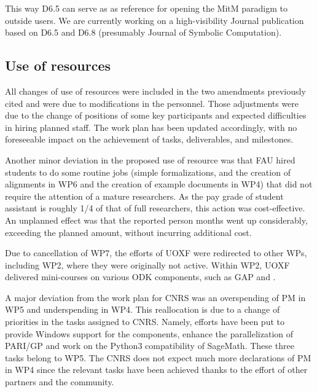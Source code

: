 This way D6.5 can serve as as reference for opening the MitM paradigm to outside users. We
are currently working on a high-visibility Journal publication based on D6.5 and D6.8
(presumably Journal of Symbolic Computation). 

\subsection{Use of resources}

All changes of use of resources were included in the two amendments previously cited and were
due to modifications in the personnel. Those adjustments were due to the change of positions
of some key \ODK participants and expected difficulties in hiring planned
staff. The work plan has been updated accordingly, with no foreseeable
impact on the achievement of tasks, deliverables, and milestones.

Another minor deviation in the proposed use of resource was that FAU hired students to do
some routine jobs (simple formalizations, and the creation of alignments in WP6 and the
creation of example documents in WP4) that did not require the attention of a mature
researchers. As the pay grade of student assistant is roughly 1/4 of that of full
researchers, this action was cost-effective. An unplanned effect was that the reported
person months went up considerably, exceeding the planned amount, without incurring
additional cost. 

Due to cancellation of WP7, the efforts of UOXF were redirected to other WPs, including
WP2, where they were originally not active. Within WP2, UOXF delivered mini-courses on various ODK components,
such as GAP and \Sage.

A major deviation from the work plan for CNRS was an overspending of PM in WP5 and
underspending in WP4. This reallocation is due to a change of priorities in the tasks
assigned to CNRS. Namely, efforts have been put to provide Windows support for
the \DOK components, enhance the parallelization of PARI/GP and work on the Python3
compatibility of SageMath. These three tasks belong to WP5. The CNRS does not expect
much more declarations of PM in WP4 since the relevant tasks have been achieved
thanks to the effort of other \ODK partners and the community.

